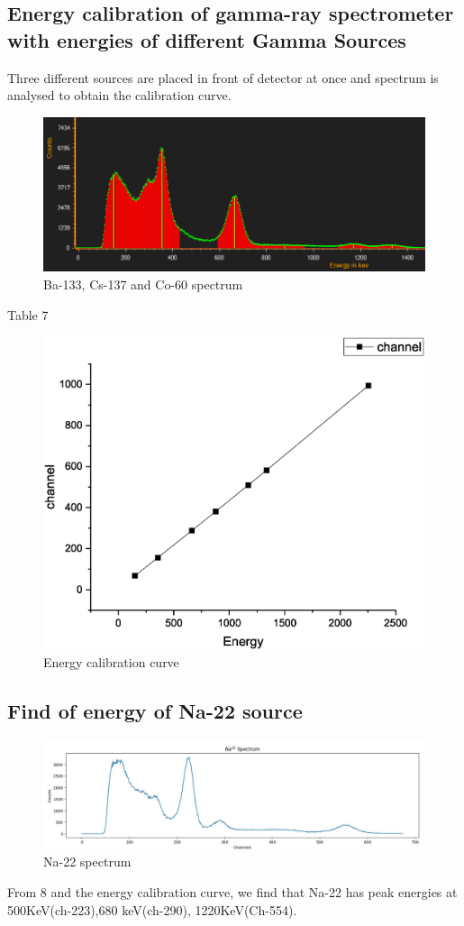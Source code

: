 	\subsection{Energy calibration of gamma-ray spectrometer with energies of different Gamma Sources}
		Three different sources are placed in front of detector at once and spectrum is analysed to obtain the calibration curve.
		\begin{figure}[H]
			\centering
			\includegraphics[width=0.9\columnwidth]{images/3mat.PNG}
			\caption{Ba-133, Cs-137 and Co-60 spectrum}
			\label{fig:3mat}
		\end{figure}
		Table 7\\
		
		\begin{figure}[H]
			\centering
			\includegraphics[width=0.9\columnwidth]{images/graph7.eps}
			\caption{Energy calibration curve}
		\end{figure}
	\subsection{Find of energy of Na-22 source}
		\begin{figure}[H]
			\centering
			\includegraphics[width=0.9\columnwidth]{images/na.PNG}
			\caption{Na-22 spectrum}
		\end{figure}
		
		From 8 and the energy calibration curve, we find that Na-22 has peak energies at 500KeV(ch-223),680 keV(ch-290), 1220KeV(Ch-554).
